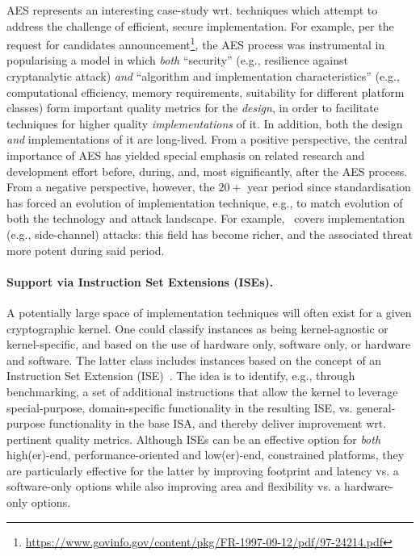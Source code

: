 AES represents an interesting case-study wrt. techniques which attempt to 
address the challenge of efficient, secure implementation.  For example,
per the request for candidates announcement\footnote{%
\url{https://www.govinfo.gov/content/pkg/FR-1997-09-12/pdf/97-24214.pdf}
}, the AES process was instrumental in popularising a model in which
{\em both}
``security''
(e.g., resilience against cryptanalytic attack)
{\em and}
``algorithm and implementation characteristics''
(e.g., computational efficiency, memory requirements, suitability for different platform classes)
form important quality metrics for the {\em design}, in order to facilitate
techniques for higher quality {\em implementations} of it.
In addition,
both the design {\em and} implementations of it are long-lived.
From a positive perspective, 
the central importance of AES has yielded special emphasis on related
research and development effort before, during, and, most significantly, 
after the AES process.
From a negative perspective, however,
the $20+$ year period since standardisation has forced an evolution of 
implementation technique, e.g., to match evolution of both the technology 
and attack landscape.  For example,~\cite[Section 3.6]{NBBBDFR:01} covers
implementation (e.g., side-channel) attacks: this field has become richer,
and the associated threat more potent during said period.


\paragraph{Support via Instruction Set Extensions (ISEs).}

A potentially large space of implementation techniques will often exist
for a given cryptographic kernel.  One could classify instances as being 
   kernel-agnostic
   or
   kernel-specific,
and based on the use of   
   hardware              only,
                software only,
   or
   hardware and software.
The latter class includes instances based on the concept of an
Instruction Set Extension (ISE)~\cite{BarGioMar:09,RegIen:16}.
The idea is to identify, e.g., through benchmarking, a set of additional 
instructions that allow the kernel to leverage
special-purpose, domain-specific functionality
in the resulting ISE,
vs. 
general-purpose                  functionality
in the base      ISA,
and thereby deliver improvement wrt. pertinent quality metrics.  
Although ISEs can be an effective option for {\em both}
high(er)-end, performance-oriented
and
 low(er)-end, constrained
platforms, 
they are particularly effective for the latter by 
improving footprint and latency
vs. a software-only options
while also
improving area      and flexibility
vs. a hardware-only options.

